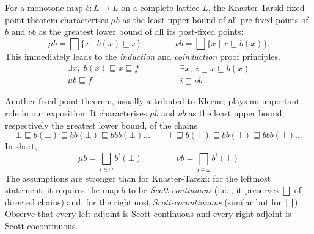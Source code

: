 \documentclass{llncs}
\begin{document}
For a monotone map $b\colon L \to L$ on a complete lattice $L$, the Knaster-Tarski fixed-point theorem characterises $\mu b$ as the least upper bound of all pre-fixed points of $b$ and $\nu b$ as the
greatest lower bound of all its post-fixed points:
\begin{equation*}\label{eq:KNfpthm}
\mu b= \bigsqcap \{ x  \mid b(x) \sqsubseteq x \} \qquad \qquad \nu b= \bigsqcup \{ x  \mid x \sqsubseteq b(x) \}\text{.}
\end{equation*} 
%
This immediately leads to the
\emph{induction} and \emph{coinduction} proof principles.
\begin{equation}\label{eq:coinductionproofprinciple}\begin{array}{c}
    \exists x, \;  b(x)\sqsubseteq x \sqsubseteq f\\
    \hline \hline %
    \mu b \sqsubseteq f
\end{array}
\qquad
\qquad
\begin{array}{c}
    \exists x, \; i \sqsubseteq x\sqsubseteq b(x)\\
    \hline \hline %
    i \sqsubseteq \nu b
\end{array}
\end{equation}

Another fixed-point theorem, usually attributed to Kleene, plays an important role in our exposition. It characterises $\mu b$ and $\nu b$ as the least upper bound, respectively the greatest lower bound, of the chains
\begin{equation}\label{eq:initfinsequences}
\bot \sqsubseteq b(\bot) \sqsubseteq bb(\bot) \sqsubseteq bbb(\bot) \dots \qquad  \top \sqsupseteq b(\top) \sqsupseteq bb(\top)  \sqsupseteq bbb(\top) \dots 
\end{equation}
In short, 
\begin{equation*}\label{eq:Kleenefpthm}
\mu b = \bigsqcup_{i\in \omega} b^i(\bot) \qquad \qquad \nu b = \bigsqcap_{i\in \omega} b^i(\top)
\end{equation*}
The assumptions are stronger than for Knaster-Tarski: for the leftmost statement, it requires the map $b$ to be \emph{Scott-continuous} (i.e.., it preserves $\bigsqcup$ of directed chains) and, for the rightmost  \emph{Scott-cocontinuous} (similar but for  $\bigsqcap$). Observe that every left adjoint is Scott-continuous and every right adjoint is Scott-cocontinuous.
%
\end{document}
